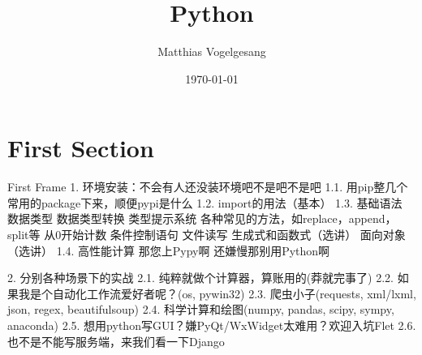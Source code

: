 \documentclass[10pt,UTF8]{ctexbeamer}
\title{Python}
\date{\today}
\author{Matthias Vogelgesang}
\institute{Centre for Modern Beamer Themes}
\begin{document}
  \maketitle
  \section{First Section}
  \begin{frame}{First Frame}
1. 环境安装：不会有人还没装环境吧不是吧不是吧
1.1.  用pip整几个常用的package下来，顺便pypi是什么
1.2.  import的用法（基本）
1.3. 基础语法
数据类型
数据类型转换
类型提示系统
各种常见的方法，如replace，append，split等
从0开始计数
条件控制语句
文件读写
生成式和函数式（选讲）
面向对象（选讲）
1.4. 高性能计算
那您上Pypy啊
还嫌慢那别用Python啊

2.  分别各种场景下的实战
2.1. 纯粹就做个计算器，算账用的(莽就完事了)
2.2. 如果我是个自动化工作流爱好者呢？(os, pywin32)
2.3. 爬虫小子(requests, xml/lxml, json, regex, beautifulsoup)
2.4. 科学计算和绘图(numpy, pandas, scipy, sympy, anaconda)
2.5. 想用python写GUI？嫌PyQt/WxWidget太难用？欢迎入坑Flet
2.6. 也不是不能写服务端，来我们看一下Django
  \end{frame}
\end{document}
